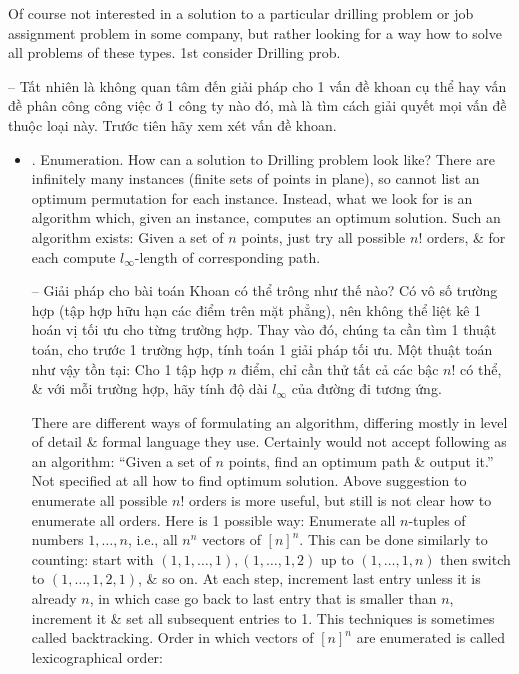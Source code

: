 \documentclass{article}
\begin{document}
\begin{itemize}
    Of course not interested in a solution to a particular drilling problem or job assignment problem in some company, but rather looking for a way how to solve all problems of these types. 1st consider Drilling prob.

    -- Tất nhiên là không quan tâm đến giải pháp cho 1 vấn đề khoan cụ thể hay vấn đề phân công công việc ở 1 công ty nào đó, mà là tìm cách giải quyết mọi vấn đề thuộc loại này. Trước tiên hãy xem xét vấn đề khoan.
    \begin{itemize}
        \item {. Enumeration.} How can a solution to Drilling problem look like? There are infinitely many instances (finite sets of points in plane), so cannot list an optimum permutation for each instance. Instead, what we look for is an algorithm which, given an instance, computes an optimum solution. Such an algorithm exists: Given a set of $n$ points, just try all possible $n!$ orders, \& for each compute $l_\infty$-length of corresponding path.

        -- Giải pháp cho bài toán Khoan có thể trông như thế nào? Có vô số trường hợp (tập hợp hữu hạn các điểm trên mặt phẳng), nên không thể liệt kê 1 hoán vị tối ưu cho từng trường hợp. Thay vào đó, chúng ta cần tìm 1 thuật toán, cho trước 1 trường hợp, tính toán 1 giải pháp tối ưu. Một thuật toán như vậy tồn tại: Cho 1 tập hợp $n$ điểm, chỉ cần thử tất cả các bậc $n!$ có thể, \& với mỗi trường hợp, hãy tính độ dài $l_\infty$ của đường đi tương ứng.

        There are different ways of formulating an algorithm, differing mostly in level of detail \& formal language they use. Certainly would not accept following as an algorithm: ``Given a set of $n$ points, find an optimum path \& output it.'' Not specified at all how to find optimum solution. Above suggestion to enumerate all possible $n!$ orders is more useful, but still is not clear how to enumerate all orders. Here is 1 possible way: Enumerate all $n$-tuples of numbers $1,\ldots,n$, i.e., all $n^n$ vectors of $[n]^n$. This can be done similarly to counting: start with $(1,1,\ldots,1),(1,\ldots,1,2)$ up to $(1,\ldots,1,n)$ then switch to $(1,\ldots,1,2,1)$, \& so on. At each step, increment last entry unless it is already $n$, in which case go back to last entry that is smaller than $n$, increment it \& set all subsequent entries to 1. This techniques is sometimes called backtracking. Order in which vectors of $[n]^n$ are enumerated is called lexicographical order:


\end{itemize}
\end{itemize}
\end{document}

